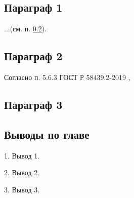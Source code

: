 \documentclass[../main.tex]{subfiles}
\begin{document}
  \subsection{Параграф 1}

  ...(см. п. \ref{sec:format-treb}).

  \subsection{Параграф 2} \label{sec:format-treb}







  Согласно п. 5.6.3 ГОСТ Р 58439.2-2019 \cite{ГОСТ_58439-2},

  \subsection{Параграф 3}





  \subsection{Выводы по главе}

  1. Вывод 1.

  2. Вывод 2.

  3. Вывод 3.
\end{document}
